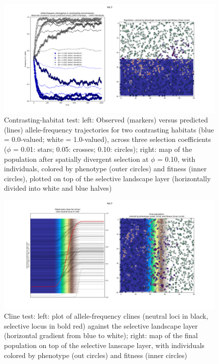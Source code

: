 ﻿\documentclass{article}
\begin{document}
\begin{figure}[h!]
\includegraphics[width=175mm]{./img/validation/divergence/divergence_test_ca1400_individuals_1000_timesteps.png}
        \caption{Contrasting-habitat test: left: Observed (markers) versus predicted (lines) allele-frequency trajectories for two contrasting habitats (blue = 0.0-valued; white = 1.0-valued), across three selection coefficients ($\phi$ = 0.01: stars; 0.05: crosses; 0.10: circles); right: map of the population after spatially divergent selection at $\phi$ = 0.10, with individuals, colored by phenotype (outer circles) and fitness (inner circles), plotted on top of the selective landscape layer (horizontally divided into white and blue halves)}
\end{figure}


\begin{figure}[h!]
\includegraphics[width=175mm]{./img/validation/cline/cline_adaptation_phi_0pt01_2500_timesteps.png}
        \caption{Cline test: left: plot of allele-frequency clines (neutral loci in black, selective locus in bold red) against the selective landscape layer (horizontal gradient from blue to white); right: map of the final population on top of the selective lanscape layer, with individuals colored by phenotype (out circles) and fitness (inner circles)}
\end{figure}
\end{document}
